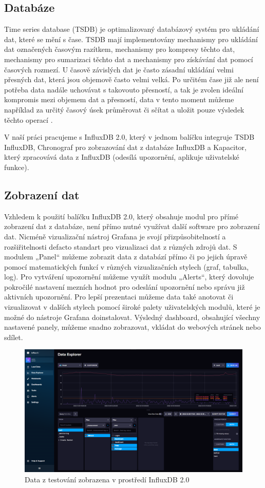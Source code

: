 \subsection{Databáze}
\par Time series database (TSDB) je optimalizovaný databázový systém pro ukládání dat, které se mění s čase. TSDB mají implementovány mechanismy pro ukládání dat označených časovým razítkem, mechanismy pro kompresy těchto dat, mechanismy pro sumarizaci těchto dat a mechanismy pro získávání dat pomocí časových rozmezí. U časově závislých dat je často zásadní ukládání velmi přesných dat, která jsou objemově často velmi velká. Po určitém čase již ale není potřeba data nadále uchovávat s takovouto přesností, a tak je zvolen ideální kompromis mezi objemem dat a přesností, data v tento moment můžeme například za určitý časový úsek průměrovat či sčítat a uložit pouze výsledek těchto operací \cite{2oiqkV8OrCVn718j}. 
\par V naší práci pracujeme s InfluxDB 2.0, který v jednom balíčku integruje TSDB InfluxDB, Chronograf pro zobrazování dat z databáze InfluxDB a Kapacitor, který zpracovává data z InfluxDB (odesílá upozornění, aplikuje uživatelské funkce).


\subsection{Zobrazení dat}
\par Vzhledem k použití balíčku InfluxDB 2.0, který obsahuje modul pro přímé zobrazení dat z databáze, není přímo nutné využívat další software pro zobrazení dat. Nicméně vizualizační nástroj Grafana je svojí přizpůsobitelností a rozšiřitelnosti defacto standart pro vizualizaci dat z různých zdrojů dat. S modulem „Panel“ můžeme zobrazit data z databází přímo či po jejich úpravě pomocí matematických funkcí v různých vizualizačních stylech (graf, tabulka, log). Pro vytváření upozornění můžeme využít modulu „Alerts“, který dovoluje pokročilé nastavení mezních hodnot pro odeslání upozornění nebo správu již aktivních upozornění. Pro lepší prezentaci můžeme data také anotovat či vizualizovat v dalších stylech pomocí široké palety uživatelských modulů, které je možné do nástroje Grafana doinstalovat. Výsledný dashboard, obsahující všechny nastavené panely, můžeme snadno zobrazovat, vkládat do webových stránek nebo sdílet.

\begin{figure}[!h]
      \begin{center}
        \includegraphics[scale=0.3]{obrazky/prace/Influx_Test.png}
      \end{center}
      \caption[Data z testování]{Data z testování zobrazena v prostředí InfluxDB 2.0}
      \label{obr:Influx}
    \end{figure}